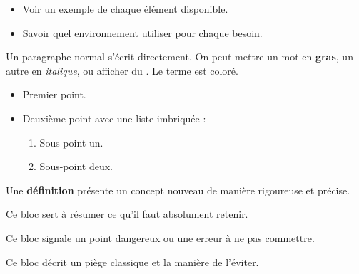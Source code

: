 %


\begin{objectifs}
\begin{itemize}
  \item Voir un exemple de chaque élément disponible.
  \item Savoir quel environnement utiliser pour chaque besoin.
\end{itemize}
\end{objectifs}


Un paragraphe normal s'écrit directement. On peut mettre un mot en
\textbf{gras}, un autre en \textit{italique}, ou afficher du
. Le terme  est coloré.

\begin{itemize}
  \item Premier point.
  \item Deuxième point avec une liste imbriquée :
  \begin{enumerate}
    \item Sous-point un.
    \item Sous-point deux.
  \end{enumerate}
\end{itemize}

\begin{definition}
Une \textbf{définition} présente un concept nouveau de manière rigoureuse
et précise.
\end{definition}

\begin{retenir}
Ce bloc sert à résumer ce qu'il faut absolument retenir.
\end{retenir}

\begin{attention}
Ce bloc signale un point dangereux ou une erreur à ne pas commettre.
\end{attention}

\begin{piege}
Ce bloc décrit un piège classique et la manière de l'éviter.
\end{piege}

